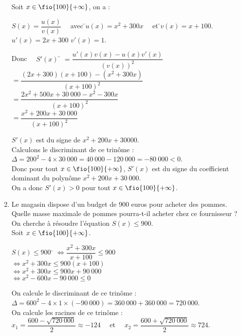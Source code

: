 \documentclass[a4paper,11pt,exos]{nsi} %
\begin{document}
\begin{enumerate}
\begin{enumalph}
        Soit $x\in\fio{100}{+\infty}$, on a :
        \begin{tabbing}
            $S(x)=\dfrac{u(x)}{v(x)}\quad$ avec \quad \=$u(x)=x^2+300x\quad$ et \quad \=$v(x)=x+100$.\\
            \>  $u'(x)=2x+300$ \> $v'(x)=1$.
        \end{tabbing}
        \begin{tabbing}
            Donc $\quad S'(x)$ \= $=\dfrac{u'(x)v(x)-u(x)v'(x)}{\left(v(x)\right)^2}$\\[.5em]
            \> $=\dfrac{(2x+300)(x+100)-(x^2+300x)}{(x+100)^2}$\\[.5em]
            \> $=\dfrac{2x^2+500x+30\ 000-x^2-300x}{(x+100)^2}$\\[.5em]
            \> $=\dfrac{x^2+200x+30\ 000}{(x+100)^2}$\\[.5em]
        \end{tabbing}
        $S'(x)$ est du signe de $x^2+200x+30000$.\\
        Calculons le discriminant de ce trinôme : $\Delta=200^2-4\times 30\ 000=40\ 000-120\ 000=-80\ 000<0$.\\
        Donc pour tout $x\in\fio{100}{+\infty}$, $S'(x)$ est du signe du coefficient dominant du polynôme $x^2+200x+30\ 000$.\\
        On a donc $S'(x)>0$ pour tout $x\in\fio{100}{+\infty}$.\\
        \begin{center}
        \end{center}
    \end{enumalph}
    \item \textcolor{UGLiBlue}{Le magasin dispose d'un budget de 900 euros pour acheter des pommes. Quelle masse maximale de pommes pourra-t-il acheter chez ce fournisseur ?}\\[.5em]
    On cherche à résoudre l'équation $S(x)\leqslant 900$.\\
    Soit $x\in\fio{100}{+\infty}$.
    \begin{tabbing}
        $S(x)\leqslant 900$ \= $\iff \dfrac{x^2+300x}{x+100}\leqslant 900$\\[.5em]
        \>  $\iff x^2+300x\leqslant 900(x+100)$\\[.5em]
        \> $\iff x^2+300x\leqslant 900x+90\ 000$\\[.5em]
        \> $\iff x^2-600x-90\ 000\leqslant 0$
    \end{tabbing}
    On calcule le discriminant de ce trinôme : $\Delta=600^2-4\times1\times (-90\ 000)=360\ 000+360\ 000=720\ 000$.\\
    On calcule les racines de ce trinôme :\\[.5em]
    $x_1=\dfrac{600-\sqrt{720\ 000}}{2}\approx -124\quad$ et $\quad x_2=\dfrac{600+\sqrt{720\ 000}}{2}\approx 724$.\\   


\end{enumerate}
\end{document}
